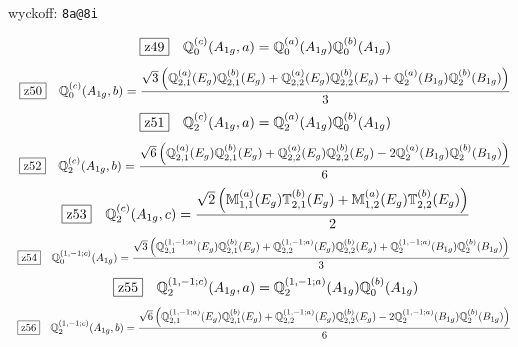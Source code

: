 \documentclass[fleqn,10pt,landscape]{jsarticle}
\begin{document}
\noindent\quad * wyckoff: \texttt{8a@8i}

\begin{dmath*}
\hspace*{3mm}\fbox{z49}\quad \mathbb{Q}_{0}^{(c)}(A_{1g},a)=\mathbb{Q}_{0}^{(a)}(A_{1g}) \mathbb{Q}_{0}^{(b)}(A_{1g})
\end{dmath*}
\begin{dmath*}
\hspace*{3mm}\fbox{z50}\quad \mathbb{Q}_{0}^{(c)}(A_{1g},b)=\frac{\sqrt{3} \left(\mathbb{Q}_{2,1}^{(a)}(E_{g}) \mathbb{Q}_{2,1}^{(b)}(E_{g}) + \mathbb{Q}_{2,2}^{(a)}(E_{g}) \mathbb{Q}_{2,2}^{(b)}(E_{g}) + \mathbb{Q}_{2}^{(a)}(B_{1g}) \mathbb{Q}_{2}^{(b)}(B_{1g})\right)}{3}
\end{dmath*}
\begin{dmath*}
\hspace*{3mm}\fbox{z51}\quad \mathbb{Q}_{2}^{(c)}(A_{1g},a)=\mathbb{Q}_{2}^{(a)}(A_{1g}) \mathbb{Q}_{0}^{(b)}(A_{1g})
\end{dmath*}
\begin{dmath*}
\hspace*{3mm}\fbox{z52}\quad \mathbb{Q}_{2}^{(c)}(A_{1g},b)=\frac{\sqrt{6} \left(\mathbb{Q}_{2,1}^{(a)}(E_{g}) \mathbb{Q}_{2,1}^{(b)}(E_{g}) + \mathbb{Q}_{2,2}^{(a)}(E_{g}) \mathbb{Q}_{2,2}^{(b)}(E_{g}) - 2 \mathbb{Q}_{2}^{(a)}(B_{1g}) \mathbb{Q}_{2}^{(b)}(B_{1g})\right)}{6}
\end{dmath*}
\begin{dmath*}
\hspace*{3mm}\fbox{z53}\quad \mathbb{Q}_{2}^{(c)}(A_{1g},c)=\frac{\sqrt{2} \left(\mathbb{M}_{1,1}^{(a)}(E_{g}) \mathbb{T}_{2,1}^{(b)}(E_{g}) + \mathbb{M}_{1,2}^{(a)}(E_{g}) \mathbb{T}_{2,2}^{(b)}(E_{g})\right)}{2}
\end{dmath*}
\begin{dmath*}
\hspace*{3mm}\fbox{z54}\quad \mathbb{Q}_{0}^{(1,-1;c)}(A_{1g})=\frac{\sqrt{3} \left(\mathbb{Q}_{2,1}^{(1,-1;a)}(E_{g}) \mathbb{Q}_{2,1}^{(b)}(E_{g}) + \mathbb{Q}_{2,2}^{(1,-1;a)}(E_{g}) \mathbb{Q}_{2,2}^{(b)}(E_{g}) + \mathbb{Q}_{2}^{(1,-1;a)}(B_{1g}) \mathbb{Q}_{2}^{(b)}(B_{1g})\right)}{3}
\end{dmath*}
\begin{dmath*}
\hspace*{3mm}\fbox{z55}\quad \mathbb{Q}_{2}^{(1,-1;c)}(A_{1g},a)=\mathbb{Q}_{2}^{(1,-1;a)}(A_{1g}) \mathbb{Q}_{0}^{(b)}(A_{1g})
\end{dmath*}
\begin{dmath*}
\hspace*{3mm}\fbox{z56}\quad \mathbb{Q}_{2}^{(1,-1;c)}(A_{1g},b)=\frac{\sqrt{6} \left(\mathbb{Q}_{2,1}^{(1,-1;a)}(E_{g}) \mathbb{Q}_{2,1}^{(b)}(E_{g}) + \mathbb{Q}_{2,2}^{(1,-1;a)}(E_{g}) \mathbb{Q}_{2,2}^{(b)}(E_{g}) - 2 \mathbb{Q}_{2}^{(1,-1;a)}(B_{1g}) \mathbb{Q}_{2}^{(b)}(B_{1g})\right)}{6}
\end{dmath*}
\end{document}
